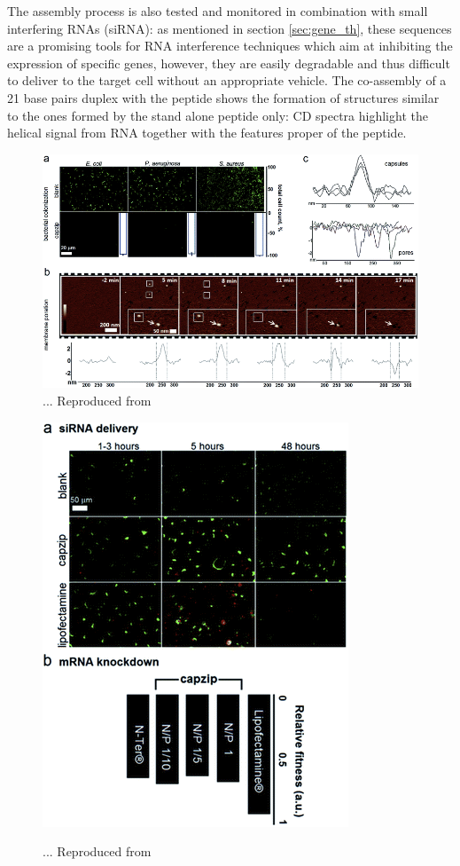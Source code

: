 The assembly process is also tested and monitored in combination with small interfering RNAs (siRNA): as mentioned in section \ref{sec:gene_th}, these sequences are a promising tools for RNA interference techniques which aim at inhibiting the expression of specific genes, however, they are easily degradable and thus difficult to deliver to the target cell without an appropriate vehicle.
%
The co-assembly of a 21 base pairs duplex with the peptide shows the formation of structures similar to the ones formed by the stand alone peptide only: CD spectra highlight the helical signal from RNA together with the features proper of the peptide.




\begin{figure}
\begin{center}
\includegraphics[width=0.8\linewidth, align = c]{1introduction/pics/AFM_on_SLB}
\caption[Experimental results on capzip]{... Reproduced from \citep{Castelletto2016}} \label{fig:exp_am}
\end{center}
\end{figure}

\begin{figure}
\begin{center}
\includegraphics[width=0.6\linewidth, align = c]{1introduction/pics/capzip_delivery.png} \label{fig:capzip_slb}
\caption[Experimental results on capzip]{... Reproduced from \citep{Castelletto2016}} \label{fig:exp_rna}
\end{center}
\end{figure}


